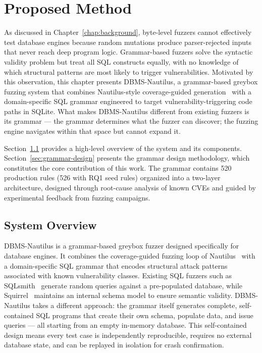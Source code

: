 \chapter{Proposed Method}
\label{chap:method}

As discussed in Chapter~\ref{chap:background}, byte-level fuzzers cannot effectively test database engines because random mutations produce parser-rejected inputs that never reach deep program logic. Grammar-based fuzzers solve the syntactic validity problem but treat all SQL constructs equally, with no knowledge of which structural patterns are most likely to trigger vulnerabilities. Motivated by this observation, this chapter presents DBMS-Nautilus, a grammar-based greybox fuzzing system that combines Nautilus-style coverage-guided generation~\citep{nautilus} with a domain-specific SQL grammar engineered to target vulnerability-triggering code paths in SQLite. What makes DBMS-Nautilus different from existing fuzzers is its grammar --- the grammar determines what the fuzzer can discover; the fuzzing engine navigates within that space but cannot expand it.

Section~\ref{sec:overview} provides a high-level overview of the system and its components. Section~\ref{sec:grammar-design} presents the grammar design methodology, which constitutes the core contribution of this work. The grammar contains 520 production rules (526 with RQ1 seed rules) organized into a two-layer architecture, designed through root-cause analysis of known CVEs and guided by experimental feedback from fuzzing campaigns.

\section{System Overview}
\label{sec:overview}

DBMS-Nautilus is a grammar-based greybox fuzzer designed specifically for database engines. It combines the coverage-guided fuzzing loop of Nautilus~\citep{nautilus} with a domain-specific SQL grammar that encodes structural attack patterns associated with known vulnerability classes. Existing SQL fuzzers such as SQLsmith~\citep{sqlsmith} generate random queries against a pre-populated database, while Squirrel~\citep{squirrel} maintains an internal schema model to ensure semantic validity. DBMS-Nautilus takes a different approach: the grammar itself generates complete, self-contained SQL programs that create their own schema, populate data, and issue queries --- all starting from an empty in-memory database. This self-contained design means every test case is independently reproducible, requires no external database state, and can be replayed in isolation for crash confirmation.

